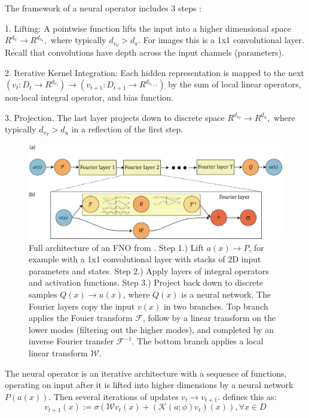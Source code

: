 \documentclass[]{article}
\begin{document}
The framework of a neural operator includes 3 steps \cite{neural_operators}:  

1. Lifting: A pointwise function lifts the input into a higher dimensional space $R^{d_a} \rightarrow R^{d_{v_0}},$ where typically $d_{v_0} > d_a$.  For images this is a 1x1 convolutional layer.  Recall that convolutions have depth across the input channels (parameters).

2. Iterative Kernel Integration:  Each hidden representation is mapped to the next $(v_t : D_t \rightarrow R^{d_{v_t}}) \rightarrow (v_{t+1} : D_{t+1} \rightarrow R^{d_{v_{t+1}}})$ by the sum of local linear operators, non-local integral operator, and bias function. 

3. Projection.  The last layer projects down to discrete space $R^{d_{v_T}} \rightarrow R^{d_u},$ where typically $d_{v_T} > d_u$ in a reflection of the first step.
\begin{figure}
	\centering
	\includegraphics[width=1.0\linewidth]{images/FNO}
	\caption[FNO]{Full architecture of an FNO from \cite{fno}.  Step 1.) Lift $a(x) \rightarrow P$, for example with a 1x1 convolutional layer with stacks of 2D input parameters and states. Step 2.) Apply layers of integral operators and activation functions. Step 3.) Project back down to discrete samples  $Q(x) \rightarrow u(x)$, where $Q(x)$ is a neural network.  The Fourier layers copy the input $v(x)$ in two branches.  Top branch applies the Fouier transform $\mathcal{F}$, follow by a linear transform on the lower modes (filtering out the higher modes), and completed by an inverse Fourier transfer $\mathcal{F}^{-1}$. The bottom branch applies a local linear transform $\mathcal{W}$.}
	\label{fig:fno}
\end{figure}
The neural operator is an iterative architecture with a sequence of functions, operating on input after it is lifted into higher dimensions by a neural network $P(a(x))$.  Then several iterations of updates $v_t \rightarrow v_{t+1}$.  \cite{fno} defines this as:
\begin{equation}
v_{t+1}(x) := \sigma(\mathcal{W}v_t(x) + (\mathcal{K}(a;\phi)v_t)(x)), \forall x \in D 
\end{equation}
\end{document}
